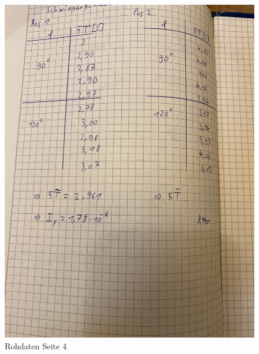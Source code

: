 \begin{figure}
  \centering
  \includegraphics[width=\textwidth, angle=270]{Bilder/Data4.jpg}
  \caption{Rohdaten Seite 4}
  \label{fig:Data4}
\end{figure}

\printbibliography{}


